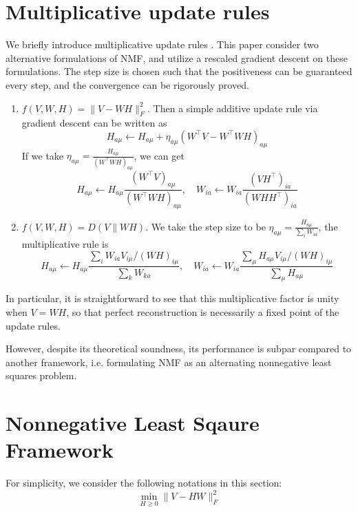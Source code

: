 \documentclass[conference,onecolumn,12pt]{IEEEtran}
\numberwithin{equation}{section}
\numberwithin{figure}{section}
\numberwithin{table}{section}
\theoremstyle{definition}
\begin{document}
\section{Multiplicative update rules}
We briefly introduce multiplicative update rules \cite{NIPS2000_1861}. This paper consider two alternative formulations of NMF, and utilize a rescaled gradient descent on these formulations. The step size is chosen such that the positiveness can be guaranteed every step, and the convergence can be rigorously proved.
\begin{enumerate}
  \item $f(V,W,H)=\|V-WH\|_F^2$. Then a simple additive update rule via gradient descent can be written as 
  \begin{equation}
    \label{additive_1}
    H_{a\mu}\gets H_{a\mu} +\eta_{a\mu}(W^\top V-W^\top W H)_{a\mu}
  \end{equation}
  If we take $\eta_{a\mu}=\frac{H_{a\mu}}{(W^\top W H)_{a\mu}}$, we can get 
  \begin{equation}
    \label{multi_1}
    H_{a\mu}\gets H_{a\mu}\frac{(W^\top V)_{a\mu}}{(W^\top W H)_{a\mu}},\quad W_{ia}\gets W_{ia}\frac{(VH^\top)_{ia}}{(WHH^\top)_{ia}}
  \end{equation}

  \item $f(V,W,H)=D(V\|WH)$. We take the step size to be $\eta_{a\mu}=\frac{H_{a\mu}}{\sum_i W_{ia}}$, the multiplicative rule is
  \begin{equation}
    \label{multi_2}
    H_{a\mu}\gets H_{a\mu} \frac{\sum_i W_{ia}V_{i\mu}/(WH)_{i\mu}}{\sum_k W_{ka}},\quad
    W_{ia}\gets W_{ia}\frac{\sum_\mu H_{a\mu}V_{i\mu}/(WH)_{i\mu}}{\sum_{\mu}H_{a\mu}}
  \end{equation}
\end{enumerate}

In particular, it is straightforward to see that this
multiplicative factor is unity when $V = W H$, so that perfect reconstruction is necessarily a fixed point of the update rules. 

However, despite its theoretical soundness, its performance is subpar compared to another framework, i.e. formulating NMF as an alternating nonnegative least squares problem. 


\section{Nonnegative Least Sqaure Framework}
For simplicity, we consider the following notations in this section:
\begin{equation}
	\min_{H\geq 0} \|V-HW\|_F^2
\end{equation}
\end{document}
